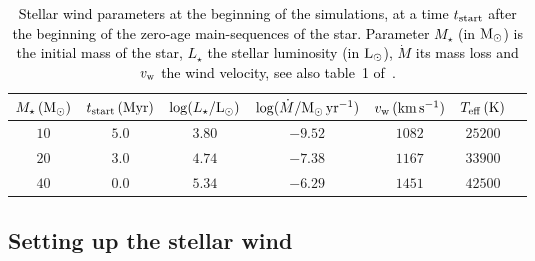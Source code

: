 \documentclass[useAMS,usenatbib]{mn2e}
\begin{document}
\begin{table}
	\centering
	\caption{
	\textcolor{black}{
	 Stellar wind parameters at the beginning of the simulations, at a time $t_{\rm start}$ 
	 after the beginning of the zero-age main-sequences of the star.
	 Parameter $M_{\star}$ (in $\rm M_{\odot}$) is the initial mass of the star, $L_{\star}$ 
	 the stellar luminosity (in $\rm L_{\odot}$), $\dot{M}$ 
	 its mass loss and $v_{\rm w}$ the wind velocity, see also table~1 of~\citet{meyer_mnras_459_2016}.
	 }   
	 }
	\begin{tabular}{ccccccc}
	\hline
	$M_{\star}\, (\rm M_{\odot})$  &  $t_{\mathrm{ start}}\, (\rm Myr)$
				   &   $\textcolor{black}{\log(L_{\star}/\rm L_{\odot})}$                              
			           &   $\log(\dot{M}/\rm M_{\odot}\, \rm yr^{-1})$
			           &   $v_{\rm w}\, (\mathrm{km}\, \mathrm{s}^{-1})$			           
			           &   $T_{\rm eff}\, (\mathrm{K})$
			\\ \hline   
	$10$ &  $5.0$  &  $3.80$ 		    &  $-9.52$   & $1082$ & $25200$         \\        
	$20$ &  $3.0$  &  $4.74$                    &  $-7.38$   & $1167$ & $33900$         \\        
  	$40$ &  $0.0$  &  $5.34$  	            &  $-6.29$   & $1451$ & $42500$         \\ 
	\hline 
	\end{tabular}
\label{tab:wind_para}
\end{table}
 



\subsection{Setting up the stellar wind}
\label{sect:ism}
\end{document}
